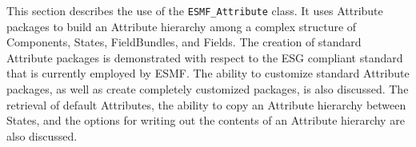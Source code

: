 %


This section describes the use of the {\tt ESMF\_Attribute} class.  It uses Attribute packages to build an Attribute hierarchy among a complex structure of Components, States, FieldBundles, and Fields.  The creation of standard Attribute packages is demonstrated with respect to the ESG compliant standard that is currently employed by ESMF.  The ability to customize standard Attribute packages, as well as create completely customized packages, is also discussed.  The retrieval of default Attributes, the ability to copy an Attribute hierarchy between States, and the options for writing out the contents of an Attribute hierarchy are also discussed.


